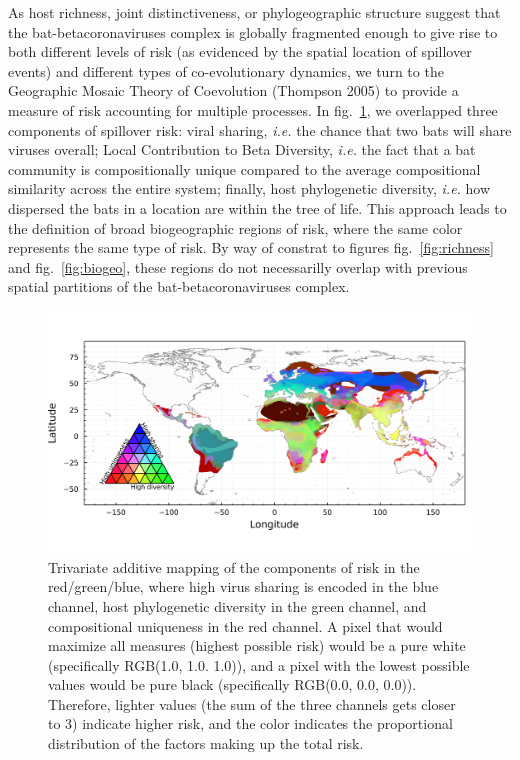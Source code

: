\documentclass[11pt]{article}
\makeatletter
\def\maxwidth{\ifdim\Gin@nat@width>\linewidth\linewidth
\else\Gin@nat@width\fi}
\let\Oldincludegraphics\includegraphics
\renewcommand{\includegraphics}[1]{\Oldincludegraphics[width=\maxwidth]{#1}}
\makeatother
\begin{document}
As host richness, joint distinctiveness, or phylogeographic structure
suggest that the bat-betacoronaviruses complex is globally fragmented
enough to give rise to both different levels of risk (as evidenced by
the spatial location of spillover events) and different types of
co-evolutionary dynamics, we turn to the Geographic Mosaic Theory of
Coevolution (Thompson 2005) to provide a measure of risk accounting for
multiple processes. In fig.~\ref{fig:trivariate}, we overlapped three
components of spillover risk: viral sharing, \emph{i.e.} the chance that
two bats will share viruses overall; Local Contribution to Beta
Diversity, \emph{i.e.} the fact that a bat community is compositionally
unique compared to the average compositional similarity across the
entire system; finally, host phylogenetic diversity, \emph{i.e.} how
dispersed the bats in a location are within the tree of life. This
approach leads to the definition of broad biogeographic regions of risk,
where the same color represents the same type of risk. By way of
constrat to figures fig.~\ref{fig:richness} and fig.~\ref{fig:biogeo},
these regions do not necessarilly overlap with previous spatial
partitions of the bat-betacoronaviruses complex.

\begin{figure}
\hypertarget{fig:trivariate}{%
\centering
\includegraphics{figures/risk_trivariate.png}
\caption{Trivariate additive mapping of the components of risk in the
red/green/blue, where high virus sharing is encoded in the blue channel,
host phylogenetic diversity in the green channel, and compositional
uniqueness in the red channel. A pixel that would maximize all measures
(highest possible risk) would be a pure white (specifically RGB(1.0,
1.0. 1.0)), and a pixel with the lowest possible values would be pure
black (specifically RGB(0.0, 0.0, 0.0)). Therefore, lighter values (the
sum of the three channels gets closer to 3) indicate higher risk, and
the color indicates the proportional distribution of the factors making
up the total risk.}\label{fig:trivariate}
}
\end{figure}
\end{document}
